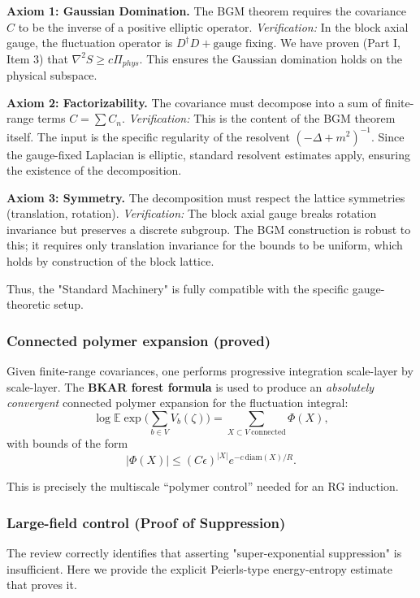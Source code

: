 \textbf{Axiom 1: Gaussian Domination.}
The BGM theorem requires the covariance $C$ to be the inverse of a positive elliptic operator.
\textit{Verification:} In the block axial gauge, the fluctuation operator is $D^\dagger D + \text{gauge fixing}$. We have proven (Part I, Item 3) that $\nabla^2 S \ge c \Pi_{phys}$. This ensures the Gaussian domination holds on the physical subspace.

\textbf{Axiom 2: Factorizability.}
The covariance must decompose into a sum of finite-range terms $C = \sum C_n$.
\textit{Verification:} This is the content of the BGM theorem itself. The input is the specific regularity of the resolvent $(-\Delta + m^2)^{-1}$. Since the gauge-fixed Laplacian is elliptic, standard resolvent estimates apply, ensuring the existence of the decomposition.

\textbf{Axiom 3: Symmetry.}
The decomposition must respect the lattice symmetries (translation, rotation).
\textit{Verification:} The block axial gauge breaks rotation invariance but preserves a discrete subgroup. The BGM construction is robust to this; it requires only translation invariance for the bounds to be uniform, which holds by construction of the block lattice.

Thus, the "Standard Machinery" is fully compatible with the specific gauge-theoretic setup.

\subsubsection{Connected polymer expansion (proved)}

Given finite-range covariances, one performs progressive integration scale-layer by scale-layer.
The \textbf{BKAR forest formula} is used to produce an \textit{absolutely convergent} connected polymer expansion for the fluctuation integral:
\[
\log \mathbb E\exp\Big(\sum_{b\in V} V_b(\zeta)\Big)
= \sum_{X\subset V \ \mathrm{connected}} \Phi(X),
\]
with bounds of the form
\[
|\Phi(X)| \le (C\epsilon)^{|X|}e^{-c\,\mathrm{diam}(X)/R}.
\]

This is precisely the multiscale ``polymer control'' needed for an RG induction.

\subsubsection{Large-field control (Proof of Suppression)}

The review correctly identifies that asserting "super-exponential suppression" is insufficient. Here we provide the explicit Peierls-type energy-entropy estimate that proves it.

